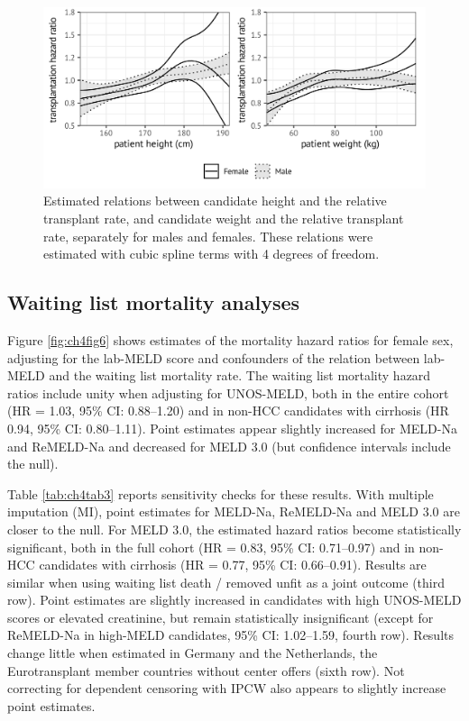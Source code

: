 \documentclass[11pt,twoside,]{book}
\begin{document}
\begin{figure}[ht]

{\centering \includegraphics[width=1\linewidth]{figures/ch4/fig5_size_sex_interactions} 

}

\caption{Estimated relations between candidate height and the relative transplant rate, and candidate weight and the relative transplant rate, separately for males and females. These relations were estimated with cubic spline terms with 4 degrees of freedom.}\label{fig:ch4fig5}
\end{figure}

\subsection{Waiting list mortality analyses}\label{CHrsltsmediationmrt}

Figure \ref{fig:ch4fig6} shows estimates of the mortality hazard ratios for
female sex, adjusting for the lab-MELD score and confounders of the relation
between lab-MELD and the waiting list mortality rate. The waiting list mortality
hazard ratios include unity when adjusting for UNOS-MELD, both in the entire
cohort (HR = 1.03, 95\% CI: 0.88--1.20) and in non-HCC candidates with cirrhosis
(HR 0.94, 95\% CI: 0.80--1.11). Point estimates appear slightly increased for
MELD-Na and ReMELD-Na and decreased for MELD 3.0 (but confidence intervals include the null).

Table \ref{tab:ch4tab3} reports sensitivity checks for these results. With multiple imputation (MI), point estimates for MELD-Na, ReMELD-Na and MELD 3.0 are closer to the null. For MELD 3.0, the estimated hazard ratios become statistically significant, both in the full cohort (HR = 0.83, 95\% CI: 0.71--0.97) and in non-HCC candidates with cirrhosis (HR = 0.77, 95\% CI: 0.66--0.91). Results are similar when using waiting list death / removed unfit as a joint outcome (third row). Point estimates are slightly increased in candidates with high UNOS-MELD scores or
elevated creatinine, but remain statistically insignificant (except for ReMELD-Na in high-MELD candidates, 95\% CI: 1.02--1.59, fourth row). Results change little when estimated in Germany and the Netherlands, the Eurotransplant member countries without center offers (sixth row). Not correcting for dependent censoring with IPCW also appears to slightly increase point estimates.
\end{document}

